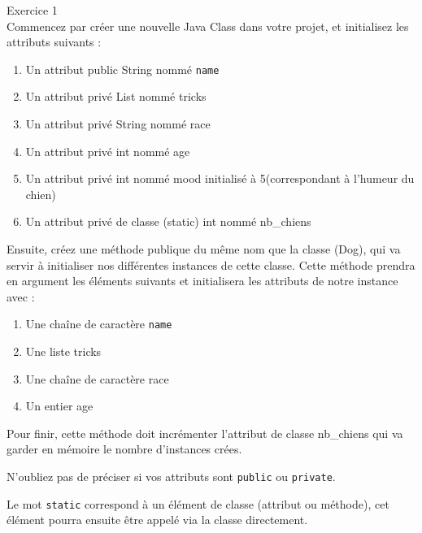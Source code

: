 \begin{Exercice}[10 minutes] Exercice 1\\
    Commencez par créer une nouvelle Java Class dans votre projet, et initialisez les attributs suivants :
    \begin{enumerate}
    \item Un attribut public String nommé \lstinline{name}
    \item Un attribut privé List nommé tricks
    \item Un attribut privé String nommé race
    \item Un attribut privé int nommé age
    \item Un attribut privé int nommé mood initialisé à 5(correspondant à l'humeur du chien)
    \item Un attribut privé de classe (static) int nommé nb\_chiens
   	\end{enumerate}
   	
   	Ensuite, créez une méthode publique du même nom que la classe (Dog), qui va servir à initialiser nos différentes instances de cette classe. Cette méthode prendra en argument les éléments suivants et initialisera les attributs de notre instance avec :
   	\begin{enumerate}
    \item Une chaîne de caractère \lstinline{name}
    \item Une liste tricks
    \item Une chaîne de caractère race
    \item Un entier age
   	\end{enumerate}
   	
   	Pour finir, cette méthode doit incrémenter l'attribut de classe nb\_chiens qui va garder en mémoire le nombre d'instances crées.
   	
\begin{conseil}
   N'oubliez pas de préciser si vos attributs sont \lstinline{public} ou \lstinline{private}.
   
   Le mot \lstinline{static} correspond à un élément de classe (attribut ou méthode), cet élément pourra ensuite être appelé via la classe directement.
\end{conseil}
    
\begin{solution}
	
\end{solution}
\end{Exercice}

